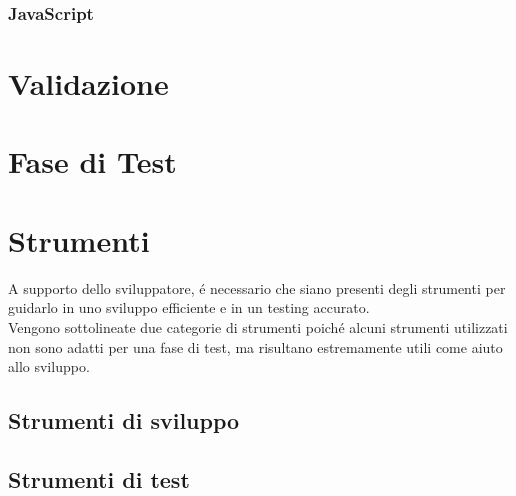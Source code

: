\documentclass[]{article}
\begin{document}
\subsubsection{JavaScript} %

\section{Validazione}

\section{Fase di Test}

\section{Strumenti}
A supporto dello sviluppatore, é necessario che siano presenti degli strumenti per guidarlo in uno sviluppo efficiente e in un testing accurato.\\
Vengono sottolineate due categorie di strumenti poiché alcuni strumenti utilizzati non sono adatti per una fase di test, ma risultano estremamente utili come aiuto allo sviluppo.
\subsection{Strumenti di sviluppo}
\subsection{Strumenti di test}
\end{document}
